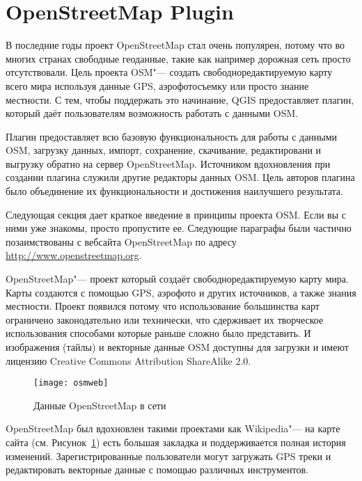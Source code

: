 
\section{OpenStreetMap Plugin}\label{plugins_osm}


В последние годы проект OpenStreetMap стал очень популярен, потому что
во многих странах свободные геоданные, такие как например дорожная сеть
просто отсутствовали. Цель проекта OSM"--- создать свободноредактируемую
карту всего мира используя данные GPS, аэрофотосъемку или просто знание
местности. С тем, чтобы поддержать это начинание, QGIS предоставляет
плагин, который даёт пользователям возможность работать с данными OSM.

Плагин предоставляет всю базовую функциональность для работы с данными
OSM, загрузку данных, импорт, сохранение, скачивание, редактировани и
выгрузку обратно на сервер OpenStreetMap. Источником вдохновления при
создании плагина служили другие редакторы данных OSM. Цель авторов
плагина было объединение их функциональности и достижения наилучшего
результата.

Следующая секция дает краткое введение в принципы проекта OSM. Если вы
с ними уже знакомы, просто пропустите ее. Следующие параграфы были
частично позаимствованы с вебсайта OpenStreetMap по адресу
\url{http://www.openstreetmap.org}.


OpenStreetMap"--- проект который создаёт свободноредактируемую карту
мира. Карты создаются с помощью GPS, аэрофото и других источников, а
также знания местности. Проект появился потому что использование
большинства карт ограничено законодательно или технически, что
сдерживает их творческое использования способами которые раньше сложно
было представить. И изображения (тайлы) и векторные данные OSM доступны
для загрузки и имеют лицензию Creative Commons Attribution ShareAlike 2.0.

\begin{figure}[ht]
   \centering
   \texttt{[image: osmweb]}
   \caption{Данные OpenStreetMap в сети \nixcaption}\label{fig:osmweb}
\end{figure}

OpenStreetMap был вдохновлен такими проектами как Wikipedia"--- на карте
сайта (см. Рисунок~\ref{fig:osmweb}) есть большая закладка
 и поддерживается полная история изменений.
Зарегистрированные пользователи могут загружать GPS треки и редактировать
векторные данные с помощью различных инструментов.


